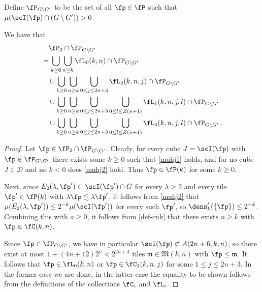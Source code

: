 Define $\fP_{G \setminus G'}$ to be the set of all $\fp \in \fP$ such that $\mu(\scI(\fp) \cap (G \setminus  G')) > 0$.
\begin{lemma}
    \label{antichain-decomposition}
    \leanok
    We have that
    \begin{align}
        \label{eq-fp'-decomposition}
        &\quad \fP_2 \cap \fP_{G \setminus G'}\\
        &= \bigcup_{k \ge 0} \bigcup_{n \ge k} \fL_0(k,n) \cap \fP_{G \setminus G'} \\
        &\quad\cup \bigcup_{k \ge 0} \bigcup_{n \ge k}\bigcup_{0 \le j \le 2n+3} \fL_2(k,n,j) \cap \fP_{G \setminus G'}\\
        &\quad\cup \bigcup_{k \ge 0} \bigcup_{n \ge k}\bigcup_{0 \le j \le 2n+3} \bigcup_{0 \le l \le Z(n+1)} \fL_1(k,n,j,l) \cap \fP_{G \setminus G'}\\
        &\quad\cup \bigcup_{k \ge 0} \bigcup_{n \ge k}\bigcup_{0 \le j \le 2n+3} \bigcup_{0 \le l \le Z(n+1)} \fL_3(k,n,j,l)\cap \fP_{G \setminus G'}\,.
    \end{align}
\end{lemma}

\begin{proof}
    \leanok
    Let $\fp \in \fP_2 \cap \fP_{G \setminus G'}$. Clearly, for every cube $J = \scI(\fp)$ with $\fp \in \fP_{G \setminus G'}$ there exists some $k \ge 0$ such that \eqref{muhj1} holds, and for no cube $J \in \mathcal{D}$ and no $k < 0$ does \eqref{muhj2} hold. Thus $\fp \in \fP(k)$ for some $k \ge 0$.

    Next, since $E_2(\lambda, \fp') \subset \scI(\fp')\cap G$ for every $\lambda \ge 2$ and every tile $\fp' \in \fP(k)$ with $\lambda\fp \lesssim \lambda \fp'$, it follows from \eqref{muhj2} that $\mu(E_2(\lambda, \fp')) \le 2^{-k} \mu(\scI(\fp'))$ for every such $\fp'$, so $\dens_k'(\{\fp\}) \le 2^{-k}$. Combining this with $a \ge 0$, it follows from \eqref{def-cnk} that there exists $n\ge k$ with $\fp \in \fC(k,n)$.

    Since $\fp \in \fP_{G \setminus G'}$, we have in particular $\scI(\fp) \not \subset A(2n + 6, k, n)$, so there exist at most $1 + (4n + 12)2^n < 2^{2n+4}$ tiles $\mathfrak{m} \in \mathfrak{M}(k,n)$ with $\fp \le \mathfrak{m}$. It follows that $\fp \in \fL_0(k,n)$ or $\fp \in \fC_1(k,n,j)$ for some $1 \le j \le 2n + 3$. In the former case we are done, in the latter case the equality to be shown follows from the definitions of the collections $\fC_i$ and $\fL_i$.
\end{proof}

